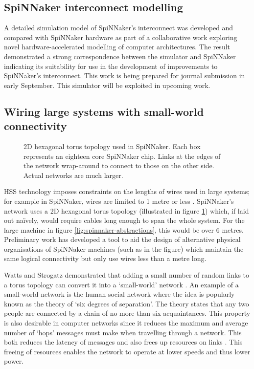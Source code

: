 	\subsection{SpiNNaker interconnect modelling}
		
		A detailed simulation model of SpiNNaker's interconnect was developed and
		compared with SpiNNaker hardware as part of a collaborative work exploring
		novel hardware-accelerated modelling of computer architectures. The result
		demonstrated a strong correspondence between the simulator and SpiNNaker
		indicating its suitability for use in the development of improvements to
		SpiNNaker's interconnect. This work is being prepared for journal submission
		in early September. This simulator will be exploited in upcoming work.
	
	\subsection{Wiring large systems with small-world connectivity}
		
		\begin{figure}
			\center
			
			
			\caption{2D hexagonal torus topology used in SpiNNaker. Each box
			represents an eighteen core SpiNNaker chip. Links at the edges of the
			network wrap-around to connect to those on the other side. Actual networks
			are much larger.}
			\label{fig:spinn-topology}
		\end{figure}
		
		HSS technology imposes constraints on the lengths of wires used in large
		systems; for example in SpiNNaker, wires are limited to 1 metre or less
		\cite{sata3spec}. SpiNNaker's network uses a 2D hexagonal torus topology
		(illustrated in figure \ref{fig:spinn-topology}) which, if laid out
		na\"ively, would require cables long enough to span the whole system. For
		the large machine in figure \ref{fig:spinnaker-abstractions}, this would be
		over 6 metres. Preliminary work has developed a tool to aid the design of
		alternative physical organisations of SpiNNaker machines (such as in the
		figure) which maintain the same logical connectivity but only use wires less
		than a metre long.
		
		Watts and Strogatz demonstrated that adding a small number of random links
		to a torus topology can convert it into a `small-world' network
		\cite{watts98}. An example of a small-world network is the human social
		network where the idea is popularly known as the theory of `six degrees of
		separation'. The theory states that any two people are connected by a chain
		of no more than six acquaintances. This property is also desirable in
		computer networks since it reduces the maximum and average number of `hops'
		messages must make when travelling through a network. This both reduces the
		latency of messages and also frees up resources on links \cite{shin11}. This
		freeing of resources enables the network to operate at lower speeds and thus
		lower power.
		

